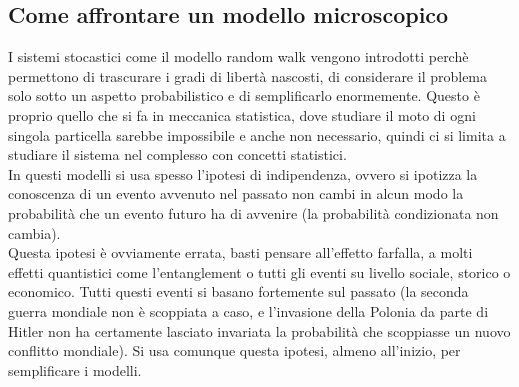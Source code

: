 \documentclass[12pt]{article}
\begin{document}
\subsection{Come affrontare un modello microscopico}
I sistemi stocastici come il modello random walk vengono introdotti perchè permettono di trascurare i gradi di libertà nascosti, di considerare il problema solo sotto un aspetto probabilistico e di semplificarlo enormemente. Questo è proprio quello che si fa in meccanica statistica, dove studiare il moto di ogni singola particella sarebbe impossibile e anche non necessario, quindi ci si limita a studiare il sistema nel complesso con concetti statistici. \\ 
In questi modelli si usa spesso l'ipotesi di indipendenza, ovvero si ipotizza la conoscenza di un evento avvenuto nel passato non cambi in alcun modo la probabilità che un evento futuro ha di avvenire (la probabilità condizionata non cambia). \\
Questa ipotesi è ovviamente errata, basti pensare all'effetto farfalla, a molti effetti quantistici come l'entanglement o tutti gli eventi su livello sociale, storico o economico. Tutti questi eventi si basano fortemente sul passato (la seconda guerra mondiale non è scoppiata a caso, e l'invasione della Polonia da parte di Hitler non ha certamente lasciato invariata la probabilità che scoppiasse un nuovo conflitto mondiale). Si usa comunque questa ipotesi, almeno all'inizio, per semplificare i modelli. 
\end{document}
